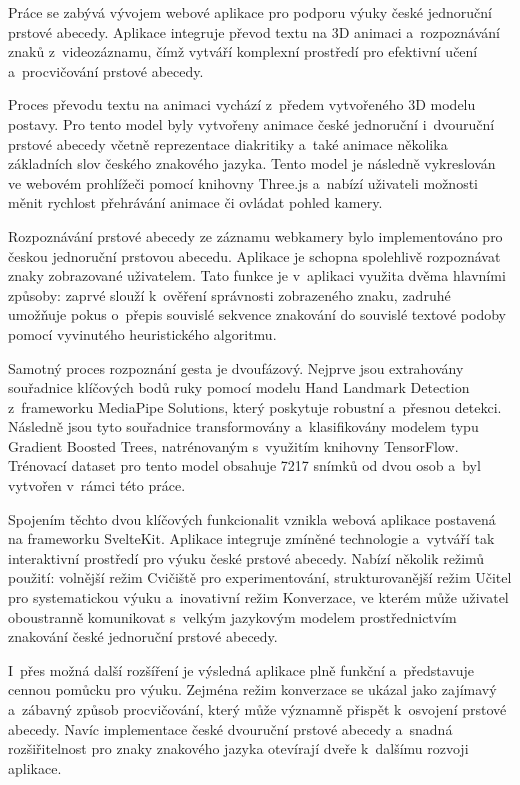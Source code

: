 \documentclass[
  master,
  program=ainfvs,
  biblatex,
  figures=true,
  tables=false,
  sourcecodes=true,
  glossaries,
  index
]{kidiplom}
\begin{document}
\begin{kiconclusions}
    Práce se zabývá vývojem webové aplikace pro podporu výuky české jednoruční prstové abecedy. Aplikace integruje převod textu na 3D animaci a~rozpoznávání znaků z~videozáznamu, čímž vytváří komplexní prostředí pro efektivní učení a~procvičování prstové abecedy.

    Proces převodu textu na animaci vychází z~předem vytvořeného 3D modelu postavy. Pro tento model byly vytvořeny animace české jednoruční i~dvouruční prstové abecedy včetně reprezentace diakritiky a~také animace několika základních slov českého znakového jazyka. Tento model je následně vykreslován ve webovém prohlížeči pomocí knihovny Three.js a~nabízí uživateli možnosti měnit rychlost přehrávání animace či ovládat pohled kamery.
    
    Rozpoznávání prstové abecedy ze záznamu webkamery bylo implementováno pro českou jednoruční prstovou abecedu. Aplikace je schopna spolehlivě rozpoznávat znaky zobrazované uživatelem. Tato funkce je v~aplikaci využita dvěma hlavními způsoby: zaprvé slouží k~ověření správnosti zobrazeného znaku, zadruhé umožňuje pokus o~přepis souvislé sekvence znakování do souvislé textové podoby pomocí vyvinutého heuristického algoritmu.
    
    Samotný proces rozpoznání gesta je dvoufázový. Nejprve jsou extrahovány souřadnice klíčových bodů ruky pomocí modelu Hand Landmark Detection z~frameworku MediaPipe Solutions, který poskytuje robustní a~přesnou detekci. Následně jsou tyto souřadnice transformovány a~klasifikovány modelem typu Gradient Boosted Trees, natrénovaným s~využitím knihovny TensorFlow. Trénovací dataset pro tento model obsahuje 7217 snímků od dvou osob a~byl vytvořen v~rámci této práce.
    
    Spojením těchto dvou klíčových funkcionalit vznikla webová aplikace postavená na frameworku SvelteKit. Aplikace integruje zmíněné technologie a~vytváří tak interaktivní prostředí pro výuku české prstové abecedy. Nabízí několik režimů použití: volnější režim Cvičiště pro experimentování, strukturovanější režim Učitel pro systematickou výuku a~inovativní režim Konverzace, ve kterém může uživatel oboustranně komunikovat s~velkým jazykovým modelem prostřednictvím znakování české jednoruční prstové abecedy.
    
    I~přes možná další rozšíření je výsledná aplikace plně funkční a~představuje cennou pomůcku pro výuku. Zejména režim konverzace se ukázal jako zajímavý a~zábavný způsob procvičování, který může významně přispět k~osvojení prstové abecedy. Navíc implementace české dvouruční prstové abecedy a~snadná rozšiřitelnost pro znaky znakového jazyka otevírají dveře k~dalšímu rozvoji aplikace.
\end{kiconclusions}
\end{document}
